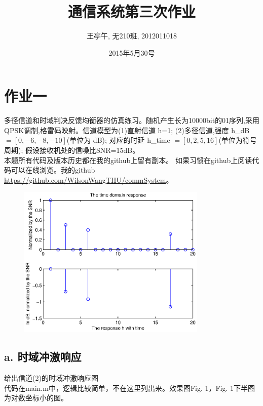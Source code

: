 \documentclass{article}
\begin{document}
\title{通信系统第三次作业}
\author{王亭午, 无210班, 2012011018}
\date{2015年5月30号}
\maketitle
\section{作业一}
多径信道和时域判决反馈均衡器的仿真练习。随机产生长为10000bit的01序列,采用
QPSK调制,格雷码映射。信道模型为(1)直射信道 h=1; (2)多径信道,强度 h\_dB \(=[0,-6,-8,-10]\)(单位为 dB);
对应的时延 h\_time \(=[0,2,5,16]\)(单位为符号周期);
假设接收机处的信噪比SNR=15dB。\\
本题所有代码及版本历史都在我的github上留有副本。
如果习惯在github上阅读代码可以在线浏览。我的github \url{https://github.com/WilsonWangTHU/commSystem}。
\begin{figure}[b!]
\centering
\includegraphics[width=9cm]{1.eps}
\caption{}
\end{figure}
\subsection*{a. 时域冲激响应}给出信道(2)的时域冲激响应图\\
代码在main.m中，逻辑比较简单，不在这里列出来。效果图Fig. 1，Fig. 1下半图为对数坐标小的图。
\end{document}
